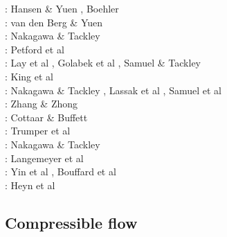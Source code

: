 \begin{scriptsize}
\nineteenninetysix: Hansen \& Yuen \cite{hayu96}, Boehler \cite{boeh96}\\
\nineteenninetyeight: van den Berg \& Yuen \cite{vayu98}\\
\twothousandfour: Nakagawa \& Tackley \cite{nata04c}\\
\twothousandseven: Petford et al \cite{pery07}\\
\twothousandeight: Lay et al \cite{lahb08}, Golabek et al \cite{gost08}, Samuel \& Tackley \cite{sata08}\\
\twothousandnine: King et al \cite{kisn09}\\
\twothousandten: Nakagawa \& Tackley \cite{nata10}, Lassak et al \cite{lamg10}, Samuel et al \cite{sate10}\\
\twothousandeleven: Zhang \& Zhong  \cite{zhzh11}\\
\twothousandtwelve: Cottaar \& Buffett  \cite{cobu12}\\
\twothousandtwelve: Trumper et al  \cite{trbh12}\\
\twothousandthirteen: Nakagawa \& Tackley  \cite{nata13}\\
\twothousandeighteen: Langemeyer et al  \cite{lalt18}\\
\twothousandnineteen: Yin et al  \cite{yiym19}, Bouffard et al \cite{bocl19}\\
\twothousandtwenty: Heyn et al \cite{hect20}
\end{scriptsize}


\subsection{Compressible flow}

